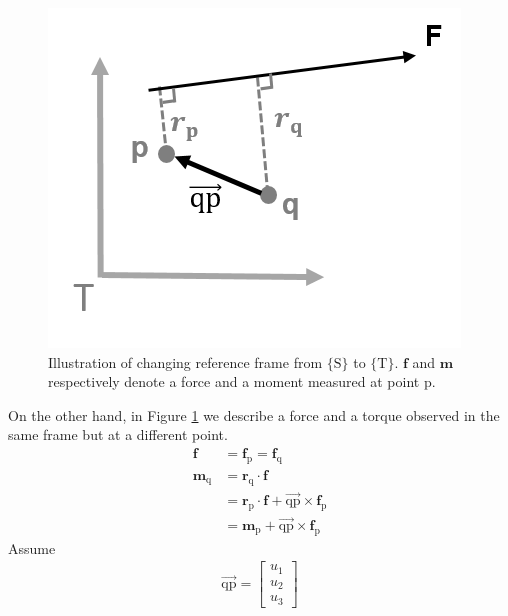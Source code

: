 \par
\begin{figure}[htbp]
\begin{center}
\includegraphics[width=0.7\linewidth]{Images/sensor_comp 2.png}
\caption{
Illustration of changing reference frame from $\{\mathrm{S}\} $ to $\{\mathrm{T}\}$. $\boldsymbol{f}$ and $\boldsymbol{m}$ respectively denote a force and a moment measured at point p.
}\label{fig:sensor_comp2}
\end{center}
\end{figure}
\par\noindent
On the other hand, in Figure \ref{fig:sensor_comp2} we describe a force and a torque observed in the same frame but at a different point.
\begin{equation}
\begin{split}
\boldsymbol{f}				&= \boldsymbol{f}_\mathrm{p} = \boldsymbol{f}_\mathrm{q}\\
\boldsymbol{m}_\mathrm{q} 	&= \boldsymbol{r}_\mathrm{q} \cdot \boldsymbol{f}\\
			 				&= \boldsymbol{r}_\mathrm{p} \cdot \boldsymbol{f}+\overrightarrow{\mathrm{q}\mathrm{p}} \times \boldsymbol{f}_\mathrm{p}\\
			 				&= \boldsymbol{m}_\mathrm{p} + \overrightarrow{\mathrm{q}\mathrm{p}}\times \boldsymbol{f}_\mathrm{p}
\end{split}
\end{equation}
Assume
\begin{equation*}
\begin{split}
\overrightarrow{\mathrm{q}\mathrm{p}}
=
\begin{bmatrix}
u_1\\
u_2\\
u_3
\end{bmatrix}
\end{split}
\end{equation*}
